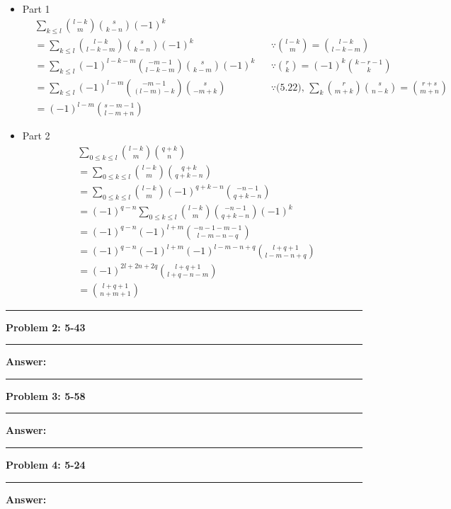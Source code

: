\documentclass[11pt]{article}
\newcommand\question[2]{\vspace{.25in}\hrule\textbf{#1: #2}\vspace{.5em}\hrule\vspace{.10in}}
\renewcommand\part[1]{\vspace{.10in}\textbf{#1}}
\begin{document}
\begin{itemize}
	\item Part 1
	\begin{align*}
		& \sum_{k \le l} \binom{l-k}{m} \binom{s}{k-n} (-1)^k \\
		& = \sum_{k \le l} \binom{l-k}{l-k-m} \binom{s}{k-n} (-1)^k
		&& \because \binom{l-k}{m} = \binom{l-k}{l-k-m} \\
		& = \sum_{k \le l} (-1)^{l-k-m} \binom{-m-1}{l-k-m} \binom{s}{k-m} (-1)^k
		&& \because \binom{r}{k} = (-1)^k \binom{k-r-1}{k} \\
		& = \sum_{k \le l} (-1)^{l-m} \binom{-m-1}{(l-m)-k} \binom{s}{-m+k}
		&& \because \text{(5.22), } \sum_k \binom{r}{m+k} \binom{s}{n-k} = \binom{r+s}{m+n} \\
		& = (-1)^{l-m} \binom{s-m-1}{l-m+n}
	\end{align*}
	\item Part 2
	\begin{align*}
		& \sum_{0 \le k \le l} \binom{l-k}{m} \binom{q+k}{n} \\
		&= \sum_{0 \le k \le l} \binom{l-k}{m} \binom{q+k}{q+k-n} \\
		&= \sum_{0 \le k \le l} \binom{l-k}{m} (-1)^{q+k-n}\binom{-n-1}{q+k-n} \\
		&= (-1)^{q-n} \sum_{0 \le k \le l} \binom{l-k}{m} \binom{-n-1}{q+k-n} (-1)^k \\
		&= (-1)^{q-n} (-1)^{l+m} \binom{-n-1-m-1}{l-m-n-q} \\
		&= (-1)^{q-n} (-1)^{l+m} (-1)^{l-m-n+q} \binom{l+q+1}{l-m-n+q} \\
		&= (-1)^{2l + 2n + 2q} \binom{l+q+1}{l+q-n-m} \\
		&= \binom{l+q+1}{n+m+1}
	\end{align*}
\end{itemize}

\question{Problem 2} {5-43}

\part{Answer:}

\question{Problem 3} {5-58}

\part{Answer:}

\question{Problem 4} {5-24}

\part{Answer:}
\end{document}
